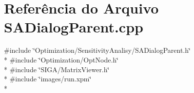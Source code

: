 \section{Referência do Arquivo S\+A\+Dialog\+Parent.\+cpp}
\label{_s_a_dialog_parent_8cpp}
{\ttfamily \#include \char`\"{}Optimization/\+Sensitivity\+Analisy/\+S\+A\+Dialog\+Parent.\+h\char`\"{}}\\*
{\ttfamily \#include \char`\"{}Optimization/\+Opt\+Node.\+h\char`\"{}}\\*
{\ttfamily \#include \char`\"{}S\+I\+G\+A/\+Matrix\+Viewer.\+h\char`\"{}}\\*
{\ttfamily \#include \char`\"{}images/run.\+xpm\char`\"{}}\\*
